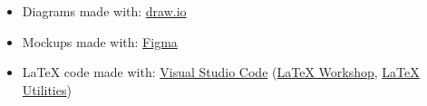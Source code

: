 \begin{itemize}
    \item Diagrams made with: \href{http://www.draw.io}{draw.io}
    \item Mockups made with: \href{https://www.figma.com/}{Figma}
    \item LaTeX code made with: \href{https://code.visualstudio.com/}{Visual Studio Code} (\href{https://marketplace.visualstudio.com/items?itemName=James-Yu.latex-workshop}{LaTeX Workshop}, \href{https://marketplace.visualstudio.com/items?itemName=tecosaur.latex-utilities}{LaTeX Utilities})
\end{itemize}